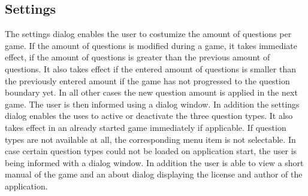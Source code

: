 \documentclass[10pt,a4paper,titlepage]{article}
\begin{document}
\subsection{Settings}
The settings dialog enables the user to costumize the amount of questions per game. If the amount of questions is modified during a game, it takes immediate effect, if the amount of questions is greater than the previous amount of questions. It also takes effect if the entered amount of questions is smaller than the previously entered amount if the game has not progressed to the question boundary yet. In all other cases the new question amount is applied in the next game. The user is then informed using a dialog window. In addition the settings dialog enables the uses to active or deactivate the three question types. It also takes effect in an already started game immediately if applicable. If question types are not available at all, the corresponding menu item is not selectable. In case certain question types could not be loaded on application start, the user is being informed with a dialog window. In addition the user is able to view a short manual of the game and an about dialog displaying the license and author of the application.
\end{document}
